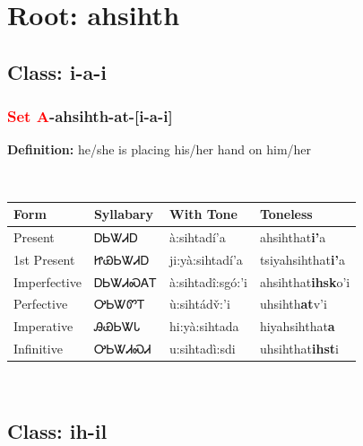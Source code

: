 \needspace{4in}
\section*{Root: ahsihth}
\nopagebreak
{}
\needspace{3in}
\subsection*{Class: i-a-i}
\nopagebreak
\needspace{2in}
\subsubsection*{\textcolor{Red}{Set A}{-}\textbf{ahsihth}{-}at{-}[i-a-i]}
\nopagebreak
\textbf{Definition: } he/she is placing his/her hand on him/her
\\[0.5em]
\begin{tabularx}{\textwidth}{l X X X}%
\toprule%
\textbf{Form}&\textbf{Syllabary}&\textbf{With Tone}&\textbf{Toneless}\\%
\midrule%
Present&ᎠᏏᏔᏗᎠ&à:sihtadí’a&ahsihthat\textbf{i'}a\\%
1st Present&ᏥᏯᏏᏔᏗᎠ&ji:yà:sihtadí’a&tsiyahsihthat\textbf{i'}a\\%
Imperfective&ᎠᏏᏔᏗᏍᎪᎢ&à:sihtadî:sgó:’i&ahsihthat\textbf{ihsk}o'i\\%
Perfective&ᎤᏏᏔᏛᎢ&ù:sihtádv̌:’i&uhsihth\textbf{at}v'i\\%
Imperative&ᎯᏯᏏᏔᏓ&hi:yà:sihtada&hiyahsihthat\textbf{a}\\%
Infinitive&ᎤᏏᏔᏗᏍᏗ&u:sihtadì:sdi&uhsihthat\textbf{ihst}i\\%
\bottomrule%
\end{tabularx}
\\[1em]
\needspace{3in}
\subsection*{Class: ih-il}
\nopagebreak
\needspace{2in}
